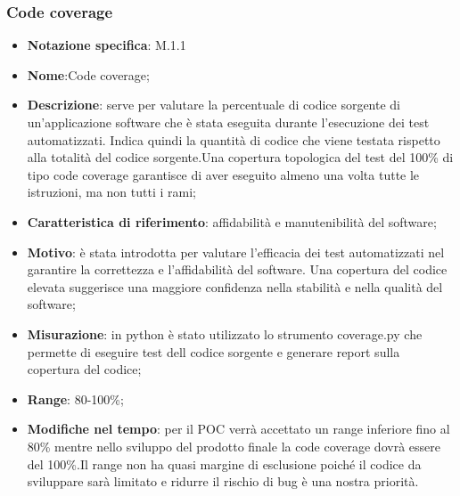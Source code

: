 \subsubsection{Code coverage}
\begin{itemize}
    \item \textbf{Notazione specifica}: M.1.1
    \item \textbf{Nome}:Code coverage;
    \item \textbf{Descrizione}: serve per valutare la percentuale di codice sorgente di un'applicazione software che è stata eseguita durante l'esecuzione dei test automatizzati. Indica quindi la quantità di codice che viene testata rispetto alla totalità del codice sorgente.Una copertura topologica del test del 100\% di tipo code coverage garantisce di aver eseguito
    almeno una volta tutte le istruzioni, ma non tutti i rami;
    \item \textbf{Caratteristica di riferimento}: affidabilità e manutenibilità del software;
    \item \textbf{Motivo}: è stata introdotta per valutare l'efficacia dei test automatizzati nel garantire la correttezza e l'affidabilità del software. Una copertura del codice elevata suggerisce una maggiore confidenza nella stabilità e nella qualità del software;
    \item \textbf{Misurazione}: in python è stato utilizzato lo strumento coverage.py che permette di eseguire test dell codice sorgente e generare report sulla copertura del codice;
    \item \textbf{Range}: 80-100\%;
    \item \textbf{Modifiche nel tempo}: per il POC verrà accettato un range inferiore fino al 80\% mentre nello sviluppo del prodotto finale la code coverage dovrà essere del 100\%.Il range non ha quasi margine di esclusione poiché il codice da sviluppare sarà limitato e ridurre il rischio di bug è una nostra priorità. 
\end{itemize}